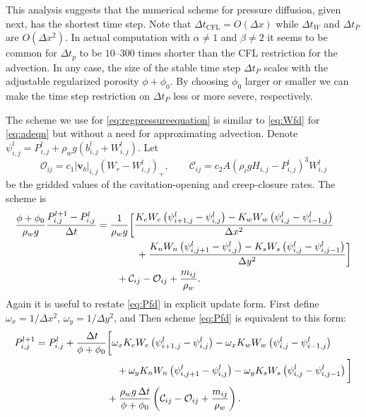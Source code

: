 \documentclass[11pt,final]{amsart}
\newcommand\bv{\mathbf{v}}
\newcommand{\Wlij}{W^l_{i,j}}
\newcommand{\Plij}{P^l_{i,j}}
\begin{document}
This analysis suggests that the numerical scheme for pressure diffusion, given next, has the shortest time step.  Note that $\Delta t_{\text{CFL}}=O(\Delta x)$ while $\Delta t_W$ and $\Delta t_P$ are $O(\Delta x^2)$.  In actual computation with $\alpha \ne 1$ and $\beta \ne 2$ it seems to be common for $\Delta t_p$ to be $10$--$300$ times shorter than the CFL restriction for the advection.  In any case, the size of the stable time step $\Delta t_P$ scales with the adjustable regularized porosity $\phi+\phi_0$.  By choosing $\phi_0$ larger or smaller we can make the time step restriction on $\Delta t_P$ less or more severe, respectively.

The scheme we use for \eqref{eq:regpressureequation} is similar to \eqref{eq:Wfd} for \eqref{eq:adeqn} but without a need for approximating advection.  Denote $\psi_{i,j}^l = P_{i,j}^l + \rho_w g (b_{i,j}^l + W_{i,j}^l)$.  Let
	$$\mathcal{O}_{ij} = c_1 |\bv_b|_{i,j} \left(W_r - \Wlij\right)_+, \qquad \mathcal{C}_{ij} = c_2 A \left(\rho_i g H_{i,j} - \Plij\right)^3 \Wlij$$
be the gridded values of the cavitation-opening and creep-closure rates.  The scheme is
\begin{align}
\frac{\phi+\phi_0}{\rho_w g} \frac{P_{i,j}^{l+1} - \Plij}{\Delta t} &= \frac{1}{\rho_w g} \bigg[\frac{K_e W_e \left(\psi_{i+1,j}^l - \psi_{i,j}^l\right) - K_w W_w \left(\psi_{i,j}^l - \psi_{i-1,j}^l\right)}{\Delta x^2}  \label{eq:Pfd} \\
      &\qquad\qquad + \frac{K_n W_n \left(\psi_{i,j+1}^l - \psi_{i,j}^l\right) - K_s W_s \left(\psi_{i,j}^l - \psi_{i,j-1}^l\right)}{\Delta y^2}\bigg] \notag \\
      &\qquad + \mathcal{C}_{ij} - \mathcal{O}_{ij} + \frac{m_{ij}}{\rho_w}. \notag
\end{align}
Again it is useful to restate \eqref{eq:Pfd} in explicit update form.  First define $\omega_x = 1/\Delta x^2$, $\omega_y = 1/\Delta y^2$, and   Then scheme \eqref{eq:Pfd} is equivalent to this form:
\begin{align}
P_{i,j}^{l+1} = \Plij +  \frac{\,\Delta t}{\phi+\phi_0} &\bigg[\omega_x K_e W_e \left(\psi_{i+1,j}^l - \psi_{i,j}^l\right) - \omega_x K_w W_w \left(\psi_{i,j}^l - \psi_{i-1,j}^l\right) \label{eq:Pfdupdate} \\
      &\quad + \omega_y K_n W_n \left(\psi_{i,j+1}^l - \psi_{i,j}^l\right) - \omega_y K_s W_s \left(\psi_{i,j}^l - \psi_{i,j-1}^l\right)\bigg] \notag \\
      &+ \frac{\rho_w g\,\Delta t}{\phi+\phi_0} \left(\mathcal{C}_{ij} - \mathcal{O}_{ij} + \frac{m_{ij}}{\rho_w}\right). \notag
\end{align}
\end{document}
